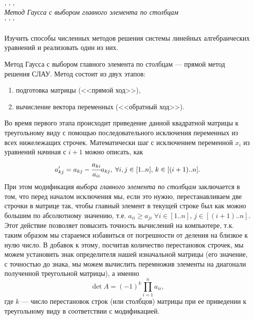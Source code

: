 


\tableofcontents


\newpage
\Chapter{\lab\ \labnumber}{\labtheme}{}

\begin{center}
, , ,
\\[2mm]
\textit{ Метод Гаусса с выбором главного элемента по столбцам }
\\[2mm]
' ' '
\end{center}

Изучить способы численных методов решения системы линейных алгебраических уравнений и реализовать один из них.

Метод Гаусса с выбором главного элемента по столбцам --- прямой метод решения СЛАУ. Метод состоит из двух этапов: \begin{enumerate}
    \item подготовка матрицы (<<прямой ход>>),
    \item вычисление вектора переменных (<<обратный ход>>).
\end{enumerate}
Во время первого этапа происходит приведение данной квадратной матрицы к треугольному виду с помощью последовательного исключения переменных из всех нижележащих строчек. Математически шаг с исключением переменной $x_i$ из уравнений начиная с $i+1$ можно описать, как
\begin{equation}
    a'_{kj} = a_{kj}-\cfrac{a_{ki}}{a_{ii}}a_{kj},\; \forall i,j\in[1..n],\, k\in[(i+1)..n].
\end{equation}
При этом модификация \textit{выбора главного элемента по столбцам} заключается в том, что перед началом исключения мы, если это нужно, перестанавливаем две строчки в матрице так, чтобы главный элемент в текущей строке был как можно большим по абсолютному значению, т.е. $a_{ii}\geq a_{ji} \;\forall i\in[1..n],\,j\in[(i+1)..n]$. Этот действие позволяет повысить точность вычислений на компьютере, т.к. таким образом мы стараемся избавиться от погрешности от деления на близкое к нулю число. В добавок к этому, посчитав количество перестановок строчек, мы можем установить знак определителя нашей изначальной матрицы (его значение, с точностью до знака, мы можем вычислить перемножив элементы на диагонали полученной треугольной матрицы), а именно \begin{equation}
    \det A = (-1)^k\prod\limits^n_{i=1}a_{ii},
\end{equation} где $k$ --- число перестановок строк (или столбцов) матрицы при ее приведении к треугольному виду в соответствии с модификацией.

